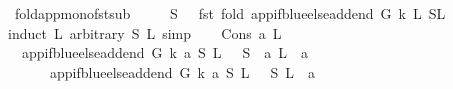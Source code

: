 \begin{isabellebody}
{\isafoldproof}%
%
\isadelimproof
\isanewline
%
\endisadelimproof
\isanewline
{}\isamarkupfalse%
\ fold{\isacharunderscore}{\kern0pt}app{\isacharunderscore}{\kern0pt}mono{\isacharunderscore}{\kern0pt}fst{\isacharunderscore}{\kern0pt}sub{\isacharcolon}{\kern0pt}\ \isanewline
\ \ \ {\isachardoublequoteopen}\ S\ {\isasymsubseteq}\ \ {\isacharparenleft}{\kern0pt}fst\ {\isacharparenleft}{\kern0pt}fold\ {\isacharparenleft}{\kern0pt}app{\isacharunderscore}{\kern0pt}if{\isacharunderscore}{\kern0pt}blue{\isacharunderscore}{\kern0pt}else{\isacharunderscore}{\kern0pt}add{\isacharunderscore}{\kern0pt}end\ G\ k{\isacharparenright}{\kern0pt}\ L{}\ {\isacharparenleft}{\kern0pt}S{\isacharcomma}{\kern0pt}L{}{\isacharparenright}{\kern0pt}{\isacharparenright}{\kern0pt}{\isacharparenright}{\kern0pt}{\isachardoublequoteclose}\ \isanewline
%
\isadelimproof
%
\endisadelimproof
%
\isatagproof
{}\isamarkupfalse%
{\isacharparenleft}{\kern0pt}induct\ L{}\ arbitrary{\isacharcolon}{\kern0pt}\ S\ L{}{\isacharcomma}{\kern0pt}\ simp{\isacharparenright}{\kern0pt}\isanewline
\ \ \isamarkupfalse%
\ {\isacharparenleft}{\kern0pt}Cons\ a\ L{}{\isacharparenright}{\kern0pt}\isanewline
\ \ \isamarkupfalse%
\ \isamarkupfalse%
\ {\isachardoublequoteopen}\ {\isacharparenleft}{\kern0pt}app{\isacharunderscore}{\kern0pt}if{\isacharunderscore}{\kern0pt}blue{\isacharunderscore}{\kern0pt}else{\isacharunderscore}{\kern0pt}add{\isacharunderscore}{\kern0pt}end\ G\ k\ a\ {\isacharparenleft}{\kern0pt}S{\isacharcomma}{\kern0pt}\ L{}{\isacharparenright}{\kern0pt}{\isacharparenright}{\kern0pt}\ {\isacharequal}{\kern0pt}\ \ {\isacharparenleft}{\kern0pt}S\ {\isasymunion}\ {\isacharbraceleft}{\kern0pt}a{\isacharbraceright}{\kern0pt}{\isacharcomma}{\kern0pt}\ L{}\ {\isacharat}{\kern0pt}\ {\isacharbrackleft}{\kern0pt}a{\isacharbrackright}{\kern0pt}{\isacharparenright}{\kern0pt}{\isachardoublequoteclose}\isanewline
\ \ \ \ {\isacharbar}{\kern0pt}\ \ {\isachardoublequoteopen}{\isacharparenleft}{\kern0pt}app{\isacharunderscore}{\kern0pt}if{\isacharunderscore}{\kern0pt}blue{\isacharunderscore}{\kern0pt}else{\isacharunderscore}{\kern0pt}add{\isacharunderscore}{\kern0pt}end\ G\ k\ a\ {\isacharparenleft}{\kern0pt}S{\isacharcomma}{\kern0pt}\ L{}{\isacharparenright}{\kern0pt}{\isacharparenright}{\kern0pt}\ {\isacharequal}{\kern0pt}\ \ {\isacharparenleft}{\kern0pt}S{\isacharcomma}{\kern0pt}\ L{}\ {\isacharat}{\kern0pt}\ {\isacharbrackleft}{\kern0pt}a{\isacharbrackright}{\kern0pt}{\isacharparenright}{\kern0pt}{\isachardoublequoteclose}\isanewline

\end{isabellebody}
